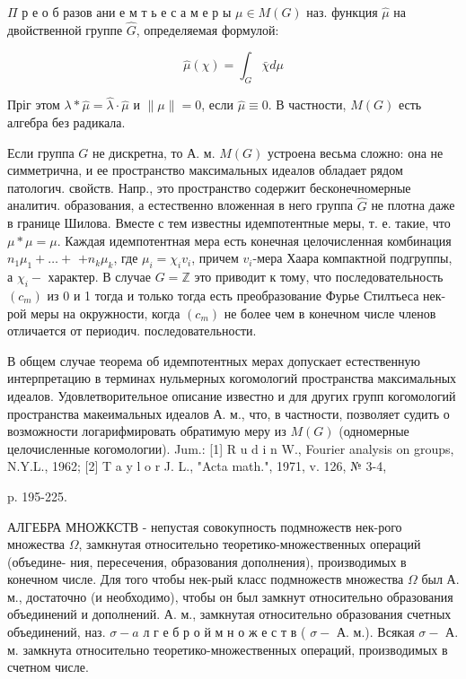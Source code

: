 \documentclass[10pt]{article}
\begin{document}
$\Pi$ р е о б разов ани е м т ь е с а м е р ы $\mu \in M(G)$ наз. функция $\hat{\mu}$ на двойственной группе $\widehat{G}$, определяемая формулой:



\[

\hat{\mu}(\chi)=\int_{G} \bar{\chi} d \mu

\]



Пріг этом $\lambda * \hat{\mu}=\hat{\lambda} \cdot \hat{\mu}$ и $\|\mu\|=0$, если $\hat{\mu} \equiv 0$. В частности, $M(G)$ есть алгебра без радикала.



Если группа $G$ не дискретна, то А. м. $M(G)$ устроена весьма сложно: она не симметрична, и ее пространство максимальных идеалов обладает рядом патологич. свойств. Напр., это пространство содержит бесконечномерные аналитич. образования, а естественно вложенная в него группа $\hat{G}$ не плотна даже в границе Шилова. Вместе с тем известны идемпотентные меры, т. е. такие, что $\mu * \mu=\mu$. Каждая идемпотентная мера есть конечная целочисленная комбинация $n_{1} \mu_{1}+\ldots+$ $+n_{k} \mu_{k}$, где $\mu_{i}=\chi_{i} v_{i}$, причем $v_{i}$-мера Хаара компактной подгруппы, а $\chi_{i}-$ характер. В случае $G=\mathbb{Z}$ это приводит к тому, что последовательность $\left(c_{m}\right)$ из 0 и 1 тогда и только тогда есть преобразование Фурье Стилтьеса нек-рой меры на окружности, когда $\left(c_{m}\right)$ не более чем в конечном числе членов отличается от периодич. последовательности.



В общем случае теорема об идемпотентных мерах допускает естественную интерпретацию в терминах нульмерных когомологий пространства максимальных идеалов. Удовлетворительное описание известно и для других групп когомологий пространства макеимальных идеалов А. м., что, в частности, позволяет судить о возможности логарифмировать обратимую меру из $M(G)$ (одномерные целочисленные когомологии). Jum.: [1] R u d i n W., Fourier analysis on groups, N.Y.L., 1962; [2] T a y l o r J. L., "Acta math.", 1971, v. 126, № 3-4,

p. 195-225.



АЛГЕБРА МНОЖКСТВ - непустая совокупность подмножеств нек-рого множества $\Omega$, замкнутая относительно теоретико-множественных операций (объедине- ния, пересечения, образования дополнения), производимых в конечном числе. Для того чтобы нек-рый класс подмножеств множества $\Omega$ был А. м., достаточно (и необходимо), чтобы он был замкнут относительно образования объединений и дополнений. А. м., замкнутая относительно образования счетных объединений, наз. $\sigma-a$ л г е б р о й м н о ж е с т в ( $\sigma-$ А. м.). Всякая $\sigma-$ А. м. замкнута относительно теоретико-множественных операций, производимых в счетном числе.
\end{document}
